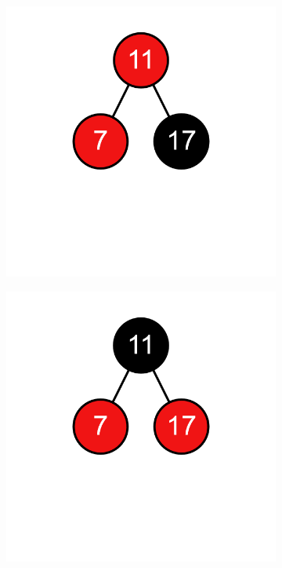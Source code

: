 \documentclass[11pt,a4paper]{article}
\begin{document}
\begin{loesung}
\begin{enumerate}[label=\alph*)]
\begin{enumerate}[label=\roman*)]
\begin{figure}[h!]
\begin{subfigure}[t]{0.15\textwidth}
                \end{subfigure}
                \begin{subfigure}[t]{0.15\textwidth}
                    \centering
                    \includegraphics[width=\textwidth]{img/2b/6}
                \end{subfigure}
                \begin{subfigure}[t]{0.15\textwidth}
                    \centering
                    \includegraphics[width=\textwidth]{img/2b/7}

\end{subfigure}
\end{figure}
\end{enumerate}
\end{enumerate}
\end{loesung}
\end{document}
